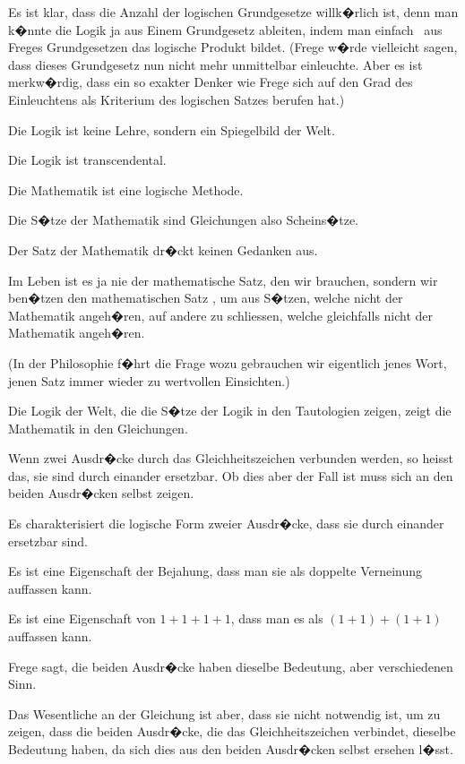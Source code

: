 {Es ist klar, dass die Anzahl der \glqq{}logischen
Grundgesetze\grqq{} willk�rlich ist, denn man k�nnte
die Logik ja aus Einem Grundgesetz ableiten,
indem man einfach \zumBeispiel\ aus Freges Grundgesetzen
das logische Produkt bildet. (Frege w�rde
vielleicht sagen, dass dieses Grundgesetz nun
nicht mehr unmittelbar einleuchte. Aber es ist
merkw�rdig, dass ein so exakter Denker wie
Frege sich auf den Grad des Einleuchtens als
Kriterium des logischen Satzes berufen hat.)}


{Die Logik ist keine Lehre, sondern ein Spiegelbild
der Welt.

Die Logik ist transcendental.}


{Die Mathematik ist eine logische Methode.

Die S�tze der Mathematik sind Gleichungen
also Scheins�tze.}


{Der Satz der Mathematik dr�ckt keinen Gedanken
aus.}


{Im Leben ist es ja nie der mathematische Satz,
den wir brauchen, sondern wir ben�tzen den
mathematischen Satz , um aus S�tzen, welche
nicht der Mathematik angeh�ren, auf andere zu
schliessen, welche gleichfalls nicht der Mathematik
angeh�ren.

(In der Philosophie f�hrt die Frage \glqq{}wozu
gebrauchen wir eigentlich jenes Wort, jenen Satz\grqq{}
immer wieder zu wertvollen Einsichten.)}


{Die Logik der Welt, die die S�tze der Logik in
den Tautologien zeigen, zeigt die Mathematik in
den Gleichungen.}


{Wenn zwei Ausdr�cke durch das Gleichheitszeichen
verbunden werden, so heisst das, sie sind
durch einander ersetzbar. Ob dies aber der Fall ist
muss sich an den beiden Ausdr�cken selbst zeigen.

Es charakterisiert die logische Form zweier Ausdr�cke,
dass sie durch einander ersetzbar sind.}


{Es ist eine Eigenschaft der Bejahung, dass man
sie als doppelte Verneinung auffassen kann.

Es ist eine Eigenschaft von \glqq{}$1 + 1 + 1 + 1$\grqq{}, dass
man es als \glqq{}$(1 + 1) + (1 + 1)$\grqq{} auffassen kann.}


{Frege sagt, die beiden Ausdr�cke haben dieselbe
Bedeutung, aber verschiedenen Sinn.

Das Wesentliche an der Gleichung ist aber, dass
sie nicht notwendig ist, um zu zeigen, dass die beiden
Ausdr�cke, die das Gleichheitszeichen verbindet,
dieselbe Bedeutung haben, da sich dies aus den
beiden Ausdr�cken selbst ersehen l�sst.}


